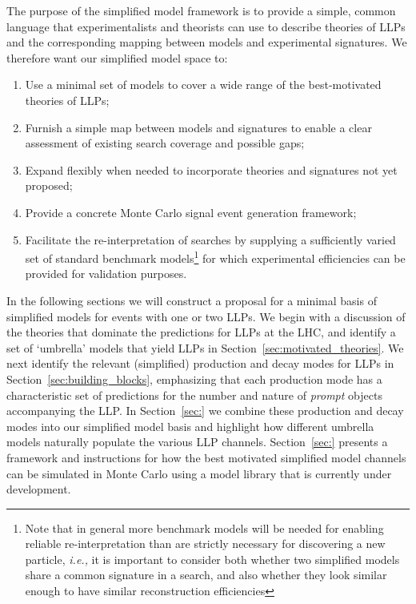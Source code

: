 The purpose of the simplified model framework is to provide a simple, common language that experimentalists and theorists can use to describe theories of LLPs and the corresponding mapping between models and experimental signatures. We therefore want our simplified model space to:
%
\begin{enumerate}
%
\item  Use a minimal set of models to cover a wide range of the best-motivated theories of LLPs;
\item  Furnish a simple map between models and signatures to enable a clear assessment of existing search coverage and possible gaps; %
\item Expand flexibly when needed to incorporate theories and signatures not yet proposed;
\item Provide a concrete Monte Carlo signal event generation framework;
\item Facilitate the re-interpretation of searches by supplying a sufficiently varied set of standard benchmark models\footnote{Note that  in general more benchmark models will be needed for enabling reliable re-interpretation than are strictly necessary for discovering a new particle, \emph{i.e.,}  it is important to consider both whether two simplified models share a common signature in a search, and also whether they look similar enough to have similar reconstruction efficiencies} for which experimental efficiencies can be provided for validation purposes.
\end{enumerate}
%
In the following sections we will construct a proposal for a minimal basis of simplified models for events with one or two LLPs.
We begin with a discussion of the theories that dominate the predictions for LLPs at the LHC, and identify a set of `umbrella' models that yield LLPs in Section~\ref{sec:motivated_theories}.  We next identify the relevant (simplified) production and decay modes for LLPs in Section~\ref{sec:building_blocks},  emphasizing that each production mode has a characteristic set of predictions for the number and nature of {\em prompt} objects accompanying the LLP.  In Section~\ref{sec:} we combine these production and decay modes into our simplified model basis and highlight how different umbrella models naturally populate the various LLP channels.  Section~\ref{sec:}  presents a framework and instructions for how the best motivated simplified model channels can be simulated in Monte Carlo using a model library that is currently under development.  

